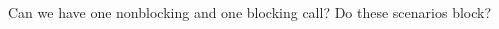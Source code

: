 \begin{multicols}{2}
    \columnbreak
  \end{multicols}

  Can we have one nonblocking and one blocking call?
  Do these scenarios block?
  \begin{multicols}{2}
    \columnbreak
  \end{multicols}


